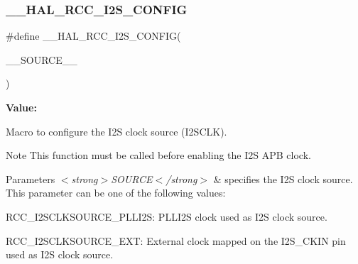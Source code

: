\subsubsection{\texorpdfstring{\_\_HAL\_RCC\_I2S\_CONFIG}{\_\_HAL\_RCC\_I2S\_CONFIG}}
{\footnotesize\ttfamily \#define \+\_\+\+\_\+\+H\+A\+L\+\_\+\+R\+C\+C\+\_\+\+I2\+S\+\_\+\+C\+O\+N\+F\+IG(\begin{DoxyParamCaption}\item[{}]{\+\_\+\+\_\+\+S\+O\+U\+R\+C\+E\+\_\+\+\_\+ }\end{DoxyParamCaption})}

{\bfseries Value\+:}
\begin{DoxyCode}{0}

\end{DoxyCode}


Macro to configure the I2S clock source (I2\+S\+C\+LK). 

\begin{DoxyNote}{Note}
This function must be called before enabling the I2S A\+PB clock. 
\end{DoxyNote}

\begin{DoxyParams}{Parameters}
{\em $<$strong$>$\+S\+O\+U\+R\+C\+E$<$/strong$>$} & specifies the I2S clock source. This parameter can be one of the following values\+: \begin{DoxyItemize}
\item R\+C\+C\+\_\+\+I2\+S\+C\+L\+K\+S\+O\+U\+R\+C\+E\+\_\+\+P\+L\+L\+I2S\+: P\+L\+L\+I2S clock used as I2S clock source. \item R\+C\+C\+\_\+\+I2\+S\+C\+L\+K\+S\+O\+U\+R\+C\+E\+\_\+\+E\+XT\+: External clock mapped on the I2\+S\+\_\+\+C\+K\+IN pin used as I2S clock source. \end{DoxyItemize}
\\
\hline
\end{DoxyParams}
\mbox{\label{group___r_c_c___p_l_l___i2_s___configuration_ga397893a952906f8caa8579a56c3a17a6}} 
